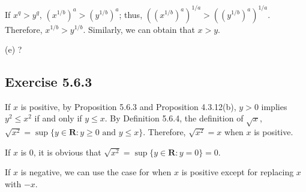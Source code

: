 \documentclass[12pt, oneside]{book}
\begin{document}
	If $x^q > y^q$, $(x^{1 / b})^a > (y^{1 / b})^a$; thus, $((x^{1 / b})^a)^{1 / a} > ((y^{1 / b})^a)^{1 / a}$. Therefore, $x^{1 / b} > y^{1 / b}$. Similarly, we can obtain that $x > y$.
	
	\bigskip
	\noindent (e) ?
	
	\subsection*{Exercise 5.6.3}
	
	If $x$ is positive, by Proposition 5.6.3 and Proposition 4.3.12(b), $y > 0$ implies $y^2 \le x^2$ if and only if $y \le x$. By Definition 5.6.4, the definition of $\sqrt{x}$, $\sqrt{x^2} = \sup \{y \in \mathbf{R}: y \ge 0 \text{ and } y \le x\}$. Therefore, $\sqrt{x^2} = x$ when $x$ is positive.
	
	If $x$ is $0$, it is obvious that $\sqrt{x^2} = \sup \{y \in \mathbf{R}: y = 0\} = 0$.
	
	If $x$ is negative, we can use the case for when $x$ is positive except for replacing $x$ with $-x$.
	
\end{document}
